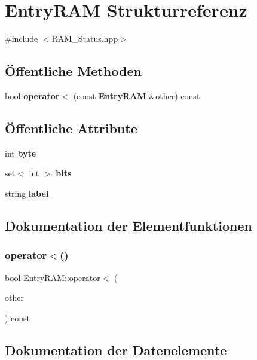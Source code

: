 \section{Entry\+R\+AM Strukturreferenz}
\label{struct_entry_r_a_m}


{\ttfamily \#include $<$R\+A\+M\+\_\+\+Status.\+hpp$>$}

\subsection*{Öffentliche Methoden}
\begin{DoxyCompactItemize}
\item 
bool \textbf{ operator$<$} (const \textbf{ Entry\+R\+AM} \&other) const
\end{DoxyCompactItemize}
\subsection*{Öffentliche Attribute}
\begin{DoxyCompactItemize}
\item 
int \textbf{ byte}
\item 
set$<$ int $>$ \textbf{ bits}
\item 
string \textbf{ label}
\end{DoxyCompactItemize}


\subsection{Dokumentation der Elementfunktionen}
\mbox{\label{struct_entry_r_a_m_a301882e799b70aebc8eae3bb55ba253a}} 
\subsubsection{operator$<$()}
{\footnotesize\ttfamily bool Entry\+R\+A\+M\+::operator$<$ (\begin{DoxyParamCaption}\item[{const \textbf{ Entry\+R\+AM} \&}]{other }\end{DoxyParamCaption}) const\hspace{0.3cm}{\ttfamily [inline]}}



\subsection{Dokumentation der Datenelemente}
\mbox{\label{struct_entry_r_a_m_adf440ec20cd0f00c8f51c7ce3621e403}} 

